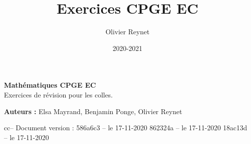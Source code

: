 \documentclass[french,12pt,a4paper]{book}
\author{Olivier Reynet}
\title{Exercices CPGE EC}
\date{2020-2021}
\begin{document}
	
	\begin{titlepage}
		\begin{center}
			\vspace*{5cm}
			
			\textbf{\Huge Mathématiques CPGE EC\\}
					   \vspace{1cm}
			Exercices de révision pour les colles. 

							\vfill
			
			\textbf{Auteurs : } Elsa Mayrand, Benjamin Ponge, Olivier Reynet
			

					\vfill
		
			

	
			\date{}
		   \vspace{0.5cm}
			 cc-- Document version : 586a6c3 -- le  17-11-2020 862324a -- le  17-11-2020 18ac13d -- le  17-11-2020 
			\vspace{1.5cm}
		\end{center}
	\end{titlepage}
	

	\tableofcontents
	
	
	
	
	
	
    
\end{document}
